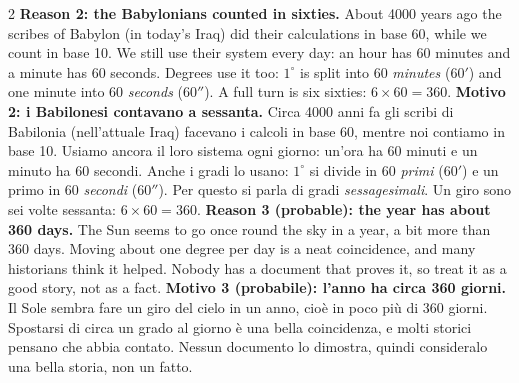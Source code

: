 \documentclass[10pt,a4paper,oneside]{book}
\newif\ifIT
\newenvironment{bi}%
  {\begin{paracol}{2}\global\ITfalse\selectlanguage{english}}%
  {\end{paracol}}
\newcommand{\IT}{\switchcolumn\global\ITtrue\selectlanguage{italian}}
\newcommand{\EN}{\switchcolumn*\global\ITfalse\selectlanguage{english}}
\begin{document}
\begin{bi}
\textbf{Reason 2: the Babylonians counted in sixties.} About 4000 years ago the scribes of Babylon (in today's Iraq) did their calculations in base 60, while we count in base 10. We still use their system every day: an hour has 60 minutes and a minute has 60 seconds. Degrees use it too: $1^\circ$ is split into 60 \emph{minutes} ($60'$) and one minute into 60 \emph{seconds} ($60''$). A full turn is six sixties: $6 \times 60 = 360$.
\IT
\textbf{Motivo 2: i Babilonesi contavano a sessanta.} Circa 4000 anni fa gli scribi di Babilonia (nell'attuale Iraq) facevano i calcoli in base 60, mentre noi contiamo in base 10. Usiamo ancora il loro sistema ogni giorno: un'ora ha 60 minuti e un minuto ha 60 secondi. Anche i gradi lo usano: $1^\circ$ si divide in 60 \emph{primi} ($60'$) e un primo in 60 \emph{secondi} ($60''$). Per questo si parla di gradi \emph{sessagesimali}. Un giro sono sei volte sessanta: $6 \times 60 = 360$.
\EN
\textbf{Reason 3 (probable): the year has about 360 days.} The Sun seems to go once round the sky in a year, a bit more than 360 days. Moving about one degree per day is a neat coincidence, and many historians think it helped. Nobody has a document that proves it, so treat it as a good story, not as a fact.
\IT
\textbf{Motivo 3 (probabile): l'anno ha circa 360 giorni.} Il Sole sembra fare un giro del cielo in un anno, cioè in poco più di 360 giorni. Spostarsi di circa un grado al giorno è una bella coincidenza, e molti storici pensano che abbia contato. Nessun documento lo dimostra, quindi consideralo una bella storia, non un fatto.
\end{bi}
\end{document}
